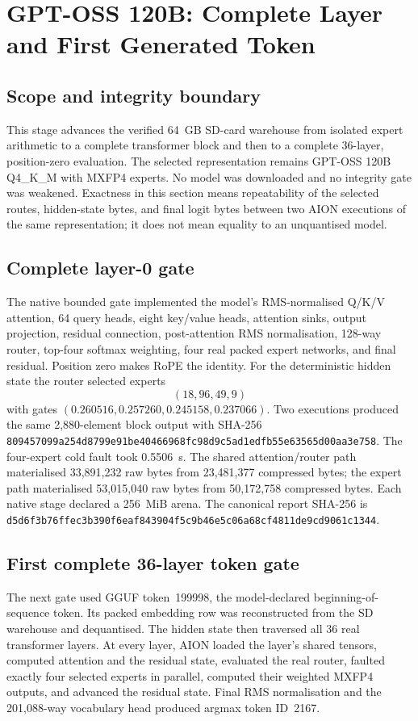 \section{GPT-OSS 120B: Complete Layer and First Generated Token}
\label{sec:gptoss120b-first-token}

\subsection{Scope and integrity boundary}
This stage advances the verified 64~GB SD-card warehouse from isolated expert
arithmetic to a complete transformer block and then to a complete 36-layer,
position-zero evaluation.  The selected representation remains GPT-OSS 120B
Q4\_K\_M with MXFP4 experts.  No model was downloaded and no integrity gate was
weakened.  Exactness in this section means repeatability of the selected routes,
hidden-state bytes, and final logit bytes between two AION executions of the
same representation; it does not mean equality to an unquantised model.

\subsection{Complete layer-0 gate}
The native bounded gate implemented the model's RMS-normalised Q/K/V attention,
64 query heads, eight key/value heads, attention sinks, output projection,
residual connection, post-attention RMS normalisation, 128-way router, top-four
softmax weighting, four real packed expert networks, and final residual.
Position zero makes RoPE the identity.  For the deterministic hidden state the
router selected experts
\[
  (18,96,49,9)
\]
with gates $(0.260516,0.257260,0.245158,0.237066)$.  Two executions produced the
same 2,880-element block output with SHA-256
\texttt{809457099a254d8799e91be40466968fc98d9c5ad1edfb55e63565d00aa3e758}.
The four-expert cold fault took 0.5506~s.  The shared attention/router path
materialised 33,891,232 raw bytes from 23,481,377 compressed bytes; the expert
path materialised 53,015,040 raw bytes from 50,172,758 compressed bytes.  Each
native stage declared a 256~MiB arena.  The canonical report SHA-256 is
\texttt{d5d6f3b76ffec3b390f6eaf843904f5c9b46e5c06a68cf4811de9cd9061c1344}.

\subsection{First complete 36-layer token gate}
The next gate used GGUF token~199998, the model-declared beginning-of-sequence
token.  Its packed embedding row was reconstructed from the SD warehouse and
dequantised.  The hidden state then traversed all 36 real transformer layers.
At every layer, AION loaded the layer's shared tensors, computed attention and
the residual state, evaluated the real router, faulted exactly four selected
experts in parallel, computed their weighted MXFP4 outputs, and advanced the
residual state.  Final RMS normalisation and the 201,088-way vocabulary head
produced argmax token ID~2167.


